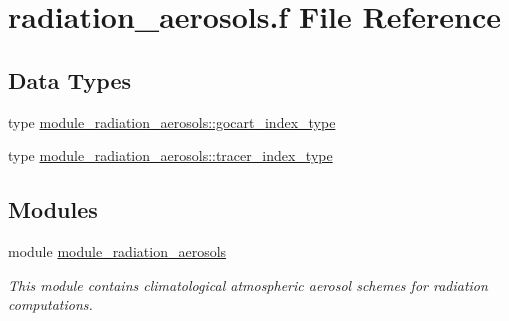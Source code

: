 \hypertarget{radiation__aerosols_8f}{}\section{radiation\+\_\+aerosols.\+f File Reference}
\label{radiation__aerosols_8f}
\subsection*{Data Types}
\begin{DoxyCompactItemize}
\item 
type \hyperlink{structmodule__radiation__aerosols_1_1gocart__index__type}{module\+\_\+radiation\+\_\+aerosols\+::gocart\+\_\+index\+\_\+type}
\item 
type \hyperlink{structmodule__radiation__aerosols_1_1tracer__index__type}{module\+\_\+radiation\+\_\+aerosols\+::tracer\+\_\+index\+\_\+type}
\end{DoxyCompactItemize}
\subsection*{Modules}
\begin{DoxyCompactItemize}
\item 
module \hyperlink{namespacemodule__radiation__aerosols}{module\+\_\+radiation\+\_\+aerosols}
\begin{DoxyCompactList}\small\item\em This module contains climatological atmospheric aerosol schemes for radiation computations. \end{DoxyCompactList}\end{DoxyCompactItemize}
